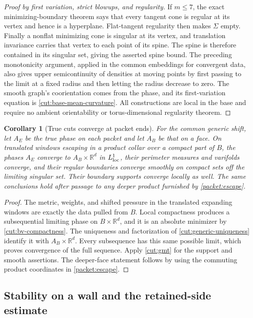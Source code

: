 \documentclass[11pt]{article}
\numberwithin{equation}{section}
\newtheorem{corollary}[theorem]{Corollary}
\theoremstyle{definition}
\theoremstyle{remark}
\begin{document}
\begin{proof}[Proof by first variation, strict blowups, and regularity]
If $m\le7$, the exact minimizing-boundary theorem says that every tangent
cone is regular at its vertex and hence is a hyperplane.  Flat-tangent
regularity then makes $\Sigma$ empty.  Finally a nonflat minimizing
cone is singular at its vertex, and translation invariance carries
that vertex to each point of its spine.  The spine is therefore
contained in its singular set, giving the asserted spine bound.
The preceding monotonicity argument, applied in the common embeddings
for convergent data, also gives upper semicontinuity of densities at
moving points by first passing to the limit at a fixed radius and then
letting the radius decrease to zero.  The smooth graph's coorientation
comes from the phase, and its first-variation equation is
\eqref{cut:base-mean-curvature}.  All constructions are local in the
base and require no ambient orientability or torus-dimensional
regularity theorem.
\end{proof}


\begin{corollary}[True cuts converge at packet ends]
\label{cut:end-convergence}
For the common generic shift, let $A_E$ be the true phase on each packet
and let $A_B$ be that on a face.  On translated windows escaping in a
product collar over a compact part of $B$, the phases $A_E$ converge to
$A_B\times\mathbb R^d$ in $L^1_{\rm loc}$, their perimeter measures and
varifolds converge, and their regular boundaries converge smoothly on
compact sets off the limiting singular set.  Their boundary supports
converge locally as well.  The same conclusions hold after passage to
any deeper product furnished by \cref{packet:escape}.
\end{corollary}

\begin{proof}
The metric, weights, and shifted pressure in the translated expanding
windows are exactly the data pulled from $B$.  Local compactness
produces a subsequential limiting phase on $B\times\mathbb R^d$, and it is
an absolute minimizer by \cref{cut:bv-compactness}.  The uniqueness and
factorization of \cref{cut:generic-uniqueness} identify it with
$A_B\times\mathbb R^d$.  Every subsequence has this same possible limit, which
proves convergence of the full sequence.  Apply \cref{cut:gmt} for the
support and smooth assertions.  The deeper-face statement follows by
using the commuting product coordinates in \cref{packet:escape}.
\end{proof}

\subsection{Stability on a wall and the retained-side estimate}
\end{document}

